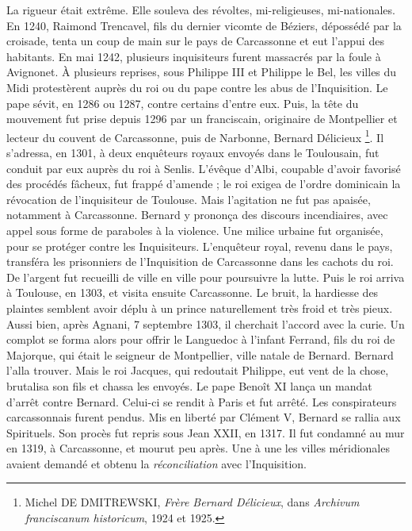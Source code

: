\documentclass[french,twoside]{book} %
\begin{document}
La rigueur était extrême. Elle souleva des révoltes, mi-religieuses, mi-nationales. En 1240, Raimond Trencavel, fils du dernier vicomte de Béziers, dépossédé par la croisade, tenta un coup de main sur le pays de Carcassonne et eut l’appui des habitants. En mai 1242, plusieurs inquisiteurs furent massacrés par la foule à Avignonet. À plusieurs reprises, sous Philippe III et Philippe le Bel, les villes du Midi protestèrent auprès du roi ou du pape contre les abus de l’Inquisition. Le pape sévit, en 1286 ou 1287, contre certains d’entre eux. Puis, la tête du mouvement fut prise depuis 1296 par un franciscain, originaire de Montpellier et lecteur du couvent de Carcassonne, puis de Narbonne, Bernard Délicieux \footnote{ Michel DE DMITREWSKI, {\itshape Frère Bernard Délicieux}, dans {\itshape Archivum franciscanum historicum}, 1924 et 1925.}. Il s’adressa, en 1301, à deux enquêteurs royaux envoyés dans le Toulousain, fut conduit par eux auprès du roi à Senlis. L’évêque d’Albi, coupable d’avoir favorisé des procédés fâcheux, fut frappé d’amende ; le roi exigea de l’ordre dominicain la révocation de l’inquisiteur de Toulouse. Mais l’agitation ne fut pas apaisée, notamment à Carcassonne. Bernard y prononça des discours incendiaires, avec appel sous forme de paraboles à la violence. Une milice urbaine fut organisée, pour se protéger contre les Inquisiteurs. L’enquêteur royal, revenu dans le pays, transféra les prisonniers de l’Inquisition de Carcassonne dans les cachots du roi. De l’argent fut recueilli de ville en ville pour poursuivre la lutte. Puis le roi arriva à Toulouse, en 1303, et visita ensuite Carcassonne. Le bruit, la hardiesse des plaintes semblent avoir déplu à un prince naturellement très froid et très pieux. Aussi bien, après Agnani, 7 septembre 1303, il cherchait l’accord avec la curie. Un complot se forma alors pour offrir le Languedoc à l’infant Ferrand, fils du roi de Majorque, qui était le seigneur de Montpellier, ville natale de Bernard. Bernard l’alla trouver. Mais le roi Jacques, qui redoutait Philippe, eut vent de la chose, brutalisa son fils et chassa les envoyés. Le pape Benoît XI lança un mandat d’arrêt contre Bernard. Celui-ci se rendit à Paris et fut arrêté. Les conspirateurs carcassonnais furent pendus. Mis en liberté par Clément V, Bernard se rallia aux Spirituels. Son procès fut repris sous Jean XXII, en 1317. Il fut condamné au mur en 1319, à Carcassonne, et mourut peu après. Une à une les villes méridionales avaient demandé et obtenu la \emph{réconciliation} avec l’Inquisition.\par
\end{document}
